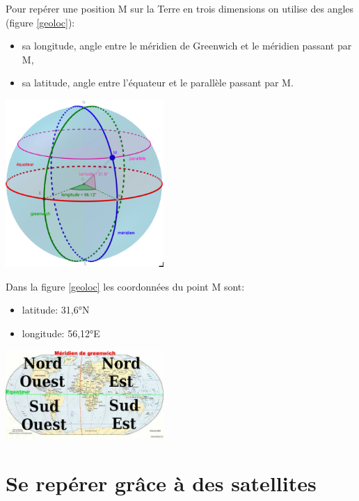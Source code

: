 \documentclass[a4paper,11pt]{article}
\begin{document}
Pour repérer une position M sur la Terre en trois dimensions on utilise des angles (figure \ref{geoloc}):
\begin{itemize}
    \item sa longitude, angle entre le méridien de Greenwich et le méridien passant par M,
    \item sa latitude, angle entre l’équateur et le parallèle passant par M.
\end{itemize}
\begin{center}
    \centering
    \includegraphics[width=6cm]{ressources/geoloc.png}
    \label{geoloc}
\end{center}
Dans la figure \ref{geoloc} les coordonnées du point M sont:
\begin{itemize}
    \item latitude: 31,6°N
    \item longitude: 56,12°E
\end{itemize}
\begin{center}
    \centering
    \includegraphics[width=6cm]{ressources/zone.png}
    \label{zone}
\end{center}
\section{Se repérer grâce à des satellites}
\end{document}
